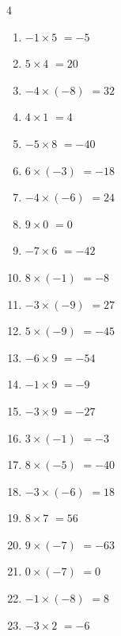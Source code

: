\begin{multicols}{4}
\begin{enumerate}
  \item $-1\times 5$
        $=-5$

  \item $5\times 4$
        $=20$

  \item $-4\times (-8)$
        $=32$

  \item $4\times 1$
        $=4$

  \item $-5\times 8$
        $=-40$

  \item $6\times (-3)$
        $=-18$

  \item $-4\times (-6)$
        $=24$

  \item $9\times 0$
        $=0$

  \item $-7\times 6$
        $=-42$

  \item $8\times (-1)$
        $=-8$

  \item $-3\times (-9)$
        $=27$

  \item $5\times (-9)$
        $=-45$

  \item $-6\times 9$
        $=-54$

  \item $-1\times 9$
        $=-9$

  \item $-3\times 9$
        $=-27$

  \item $3\times (-1)$
        $=-3$

  \item $8\times (-5)$
        $=-40$

  \item $-3\times (-6)$
        $=18$

  \item $8\times 7$
        $=56$

  \item $9\times (-7)$
        $=-63$

  \item $0\times (-7)$
        $=0$

  \item $-1\times (-8)$
        $=8$

  \item $-3\times 2$
        $=-6$


\end{enumerate}
\end{multicols}
